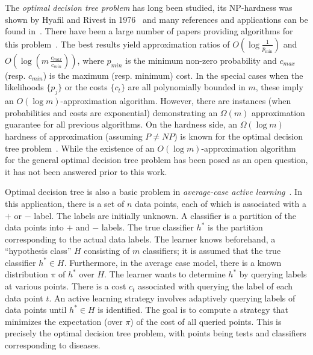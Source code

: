 \documentclass[11pt]{article}
\def\dtp{optimal decision tree problem\xspace}
\begin{document}
The \emph{\dtp} has long been studied, its NP-hardness was shown by Hyafil and Rivest in 1976~\cite{rivest-hyafil}  and
many references and applications can be found in~\cite{N11}. 
There have been a large number of papers providing algorithms for this problem~\cite{garey-graham,loveland,kmb,dasgupta,AH12,CPRAM11,N11,gb09}. The best results yield approximation ratios of $O\left(\log \frac1{p_{\min}}\right)$ and $O\left(\log (m\,\frac{c_{max}}{c_{min}})\right)$, where $p_{min}$ is the minimum non-zero probability and $c_{max}$ (resp. $c_{min}$) is the maximum (resp. minimum) cost. In the special cases when the likelihoods $\{p_j\}$ or the costs
$\{c_t\}$ are all polynomially bounded in $m$, these imply an $O(\log m)$-approximation
algorithm. However, there are instances (when probabilities and costs are exponential) demonstrating an $\Omega(m)$ approximation guarantee for all previous algorithms. On the hardness side, an $\Omega(\log m)$ hardness of approximation (assuming $P\ne NP$) is known for the \dtp~\cite{CPRAM11}. 
While the existence of an $O(\log m)$-approximation algorithm for the general \dtp has been posed as an open question,
it has not been answered prior to this work.
 


Optimal decision tree is also a basic problem in {\em average-case active learning}~\cite{dasgupta,N11,gb09}. In this
application, there is a set of $n$ data points, each of which is associated with a $+$ or $-$ label. The labels are
initially unknown. A classifier is a partition of the data points into $+$ and $-$ labels. The true classifier $h^*$ is
the partition corresponding to the actual data labels. The learner knows beforehand, a ``hypothesis class'' $H$
consisting of $m$ classifiers; it is assumed that the true classifier $h^*\in H$. Furthermore, in the average case
model, there is a known distribution $\pi$ of $h^*$ over $H$. The learner wants to determine $h^*$ by querying labels
at various points. There is a cost $c_t$ associated with querying the label of each data point $t$. An active learning
strategy involves adaptively querying labels of data points until $h^*\in H$ is identified. The goal is to compute a
strategy that minimizes the expectation (over $\pi$) of the cost of all queried points. This is precisely the \dtp,
with points being tests and classifiers corresponding to diseases.
\end{document}
